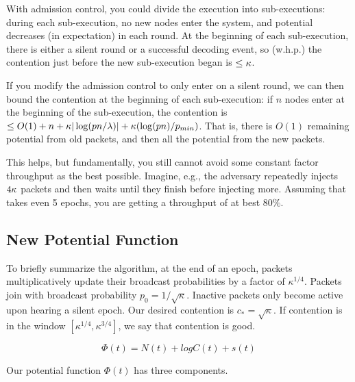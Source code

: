 With admission control, you could divide the execution into sub-executions: during each sub-execution, no new nodes enter the system, and potential decreases (in expectation) in each round.  At the beginning of each sub-execution, there is either a silent round or a successful decoding event, so (w.h.p.) the contention just before the new sub-execution began is $\leq \kappa$.  

If you modify the admission control to only enter on a silent round, we can then bound the contention at the beginning of each sub-execution: if $n$ nodes enter at the beginning of the sub-execution, the contention is $\leq O(1) + n + \kappa|\log(pn/\lambda)| + \kappa(\log(pn)/p_{min})$.  That is, there is $O(1)$ remaining potential from old packets, and then all the potential from the new packets.  

This helps, but fundamentally, you still cannot avoid some constant factor throughput as the best possible. Imagine, e.g., the adversary repeatedly injects $4\kappa$ packets and then waits until they finish before injecting more.  Assuming that takes even 5 epochs, you are getting a throughput of at best $80\%$. 


\subsection{New Potential Function}

To briefly summarize the algorithm, at the end of an epoch, packets multiplicatively update their broadcast probabilities by a factor of $\kappa^{1/4}$. Packets join with broadcast probability $p_0 = 1/\sqrt{\kappa}$. Inactive packets only become active upon hearing a silent epoch. Our desired contention is $c_* = \sqrt{\kappa}$. If contention is in the window $[\kappa^{1/4}, \kappa^{3/4}]$, we say that contention is good.

\[\Phi(t) = N(t) + logC(t) + s(t)\]

Our potential function $\Phi(t)$ has three components.

